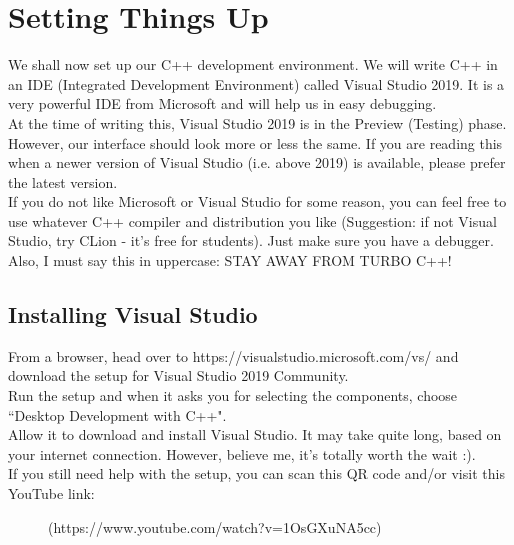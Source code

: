 \documentclass[letterpaper, 12pt]{book}
\begin{document}
\section{Setting Things Up}
We shall now set up our C++ development environment. We will write C++ in an IDE (Integrated Development Environment) called Visual Studio 2019. It is a very powerful IDE from Microsoft and will help us in easy debugging.\\
At the time of writing this, Visual Studio 2019 is in the Preview (Testing) phase. However, our interface should look more or less the same. If you are reading this when a newer version of Visual Studio (i.e. above 2019) is available, please prefer the latest version.\\
If you do not like Microsoft or Visual Studio for some reason, you can feel free to use whatever C++ compiler and distribution you like (Suggestion: if not Visual Studio, try CLion - it's free for students). Just make sure you have a debugger.\\
Also, I must say this in uppercase: STAY AWAY FROM TURBO C++!
\subsection{Installing Visual Studio}
From a browser, head over to https://visualstudio.microsoft.com/vs/ and download the setup for Visual Studio 2019 Community.\\ Run the setup and when it asks you for selecting the components, choose ``Desktop Development with C++".\\
Allow it to download and install Visual Studio. It may take quite long, based on your internet connection. However, believe me, it's totally worth the wait :).\\
If you still need help with the setup, you can scan this QR code and/or visit this YouTube link:\\
\begin{figure}[h]
\centering
{}
\caption{(https://www.youtube.com/watch?v=1OsGXuNA5cc)}
\end{figure}
\end{document}
